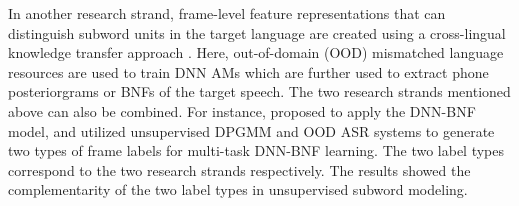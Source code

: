 \documentclass[a4paper]{article}
\begin{document}
In another research strand, frame-level feature representations that can distinguish subword units in the target language are created using a cross-lingual knowledge transfer approach \cite{feng2019_TASLP,shibata2017composite}. Here, out-of-domain (OOD) mismatched language resources are used to train DNN AMs which are further used to extract phone posteriorgrams or BNFs of the target speech.
The two research strands mentioned above can also be combined.
For instance, \cite{feng2019_TASLP} proposed to 
apply the DNN-BNF model, and  utilized  unsupervised   DPGMM  and OOD ASR systems  to  generate two types of frame labels for multi-task DNN-BNF learning. The two label types correspond to  the two research strands respectively. 
The results  showed the complementarity of the two label types in unsupervised subword modeling.
\end{document}
